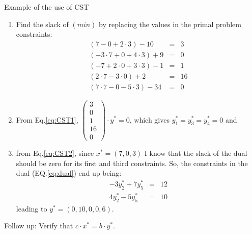 \documentclass[c]{beamer}
\begin{document}
\begin{frame}[allowframebreaks]{Example of the use of CST}
  \begin{enumerate}
    \item Find the slack of $(min)$ by replacing the values in the primal problem constraints:
    \[\begin{array}{rcl}
      (7-0+2\cdot 3)-10&=&3 \\
      (-3\cdot 7+0+4\cdot 3)+9&=&0 \\
      (-7+2\cdot 0+3\cdot 3)-1&=&1\\
      (2\cdot 7-3\cdot 0)+2&=&16\\
      (7\cdot 7-0-5\cdot 3)-34&=&0
    \end{array}\]
  \item From Eq.\ref{eq:CST1}, $\begin{pmatrix}3\\0\\1\\16\\0\end{pmatrix}\cdot y^*=0$, which gives $y^*_1=y^*_3=y^*_4=0$ and
  \item from Eq.\ref{eq:CST2}, since $x^*=(7,0,3)$ I know that the slack of the dual should be zero for its first and  third constraints. So, the constraints in the dual (EQ.\ref{eq:dual}) end up being:
  \[
  \begin{array}{rcl}
    -3y_2^*+7y_5^*&=&12\\
    4y_2^*-5y_5^*&=&10
  \end{array}\]
  leading to $y^*=(0,10,0,0,6)$.
\end{enumerate}
Follow up: Verify that $c\cdot x^*=b\cdot y^*$.

\end{frame}

\end{document}

